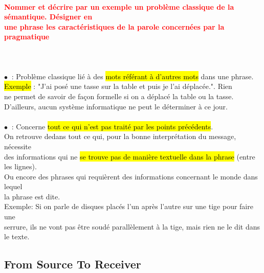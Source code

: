 \documentclass[letterpaper, 12pt]{article}
\newcommand{\alinea}{
\hspace*{0.3cm}}
\newcommand{\red}[1]{
	\textcolor{red}{#1}
}
\newcommand{\myul}[1]{
	\underline{\smash{#1}}
}
\newcommand{\point}{$\bullet\ $}
\begin{document}
		\paragraph{\red{Nommer et décrire par un exemple un problème classique de la sémantique. Désigner en  
		~\\ \hspace*{0.035cm} une phrase les caractéristiques de la parole concernées par la pragmatique}}~\\~\\
			\point \myul{\hl{Anaphore}} : Problème classique lié à des \hl{mots r\'ef\'erant \`a d'autres mots} 
				dans une phrase.
				\\\alinea \hl{Exemple} : "J'ai posé une tasse sur la table et puis je l'ai déplacée.". Rien
				\\\alinea ne permet de savoir de fa\c con formelle si on a déplacé la table ou la tasse.
				\\\alinea D'ailleurs, aucun système informatique ne peut le déterminer à ce jour.\\~\\
			\point \myul{Pragmatique} : Concerne \hl{tout ce qui n'est pas trait\'e par les points pr\'ec\'edents}.
				\\\alinea On retrouve dedans tout ce qui, pour la bonne interprétation du message, nécessite
				\\\alinea des informations qui ne \hl{se trouve pas de mani\`ere textuelle dans la phrase} 
				(entre les lignes). \\\alinea Ou encore des phrases qui requièrent des informations concernant le
				monde dans lequel \\\alinea la phrase est dite.
				\\\alinea Exemple: Si on parle de disques placés l'un après l'autre sur une tige pour faire une
				\\\alinea serrure, ils ne vont pas être soudé parallèlement à la tige, mais rien ne le dit dans 
				le texte.
		
	\subsection{From Source To Receiver}
		
\end{document}
